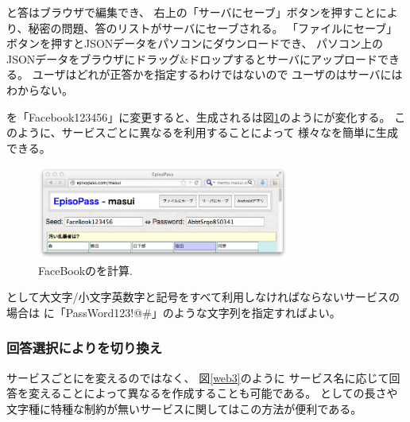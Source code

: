 \documentclass[twoside]{wiss}
\begin{document}
{\SQ}と答はブラウザで編集でき、
右上の「サーバにセーブ」ボタンを押すことにより{\SS}、秘密の問題、答のリストがサーバにセーブされる。
「ファイルにセーブ」ボタンを押すとJSONデータをパソコンにダウンロードでき、
パソコン上のJSONデータをブラウザにドラッグ\&ドロップするとサーバにアップロードできる。
ユーザはどれが正答かを指定するわけではないので
ユーザの{\PW}はサーバにはわからない。

{\SS}を「\textsf{Facebook123456}」に変更すると、生成される{\PW}は図\ref{web2}のようにが変化する。
このように、サービスごとに異なる{\SS}を利用することによって
様々な{\PW}を簡単に生成できる。

\begin{figure}[H]
\centerline{\includegraphics[width=83mm,bb=0 0 718 265]{figures/36c371a13a8250c60fb9c03174382443.png}}
\caption{FaceBookの{\PW}を計算.}
\label{web2}
\end{figure}

{\PW}として大文字/小文字英数字と記号をすべて利用しなければならないサービスの場合は
{\SS}に「\textsf{PassWord123!@\#}」のような文字列を指定すればよい。

\subsubsection{回答選択により{\PW}を切り換え}
\label{pwgen}

サービスごとに{\SS}を変えるのではなく、
図\ref{web3}のように
サービス名に応じて回答を変えることによって異なる{\PW}を作成することも可能である。
{\PW}としての長さや文字種に特種な制約が無いサービスに関してはこの方法が便利である。
\end{document}
